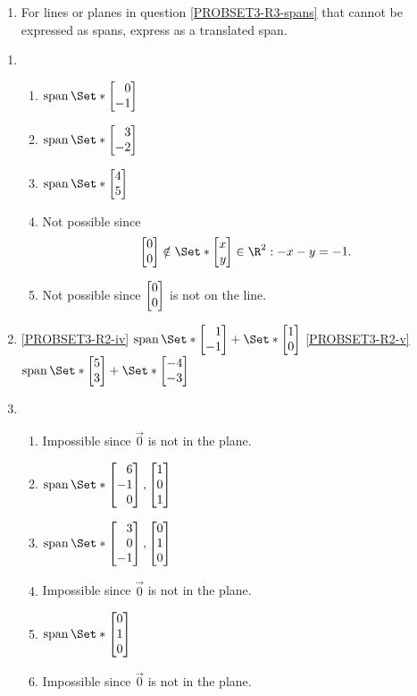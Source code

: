 \begin{exercises}
\begin{problist}
\begin{enumerate}
			\item For lines or planes in question \ref{PROBSET3-R3-spans} that cannot
			be expressed as spans, express as a translated
			span.
		\end{enumerate}
		\begin{solution}
			\begin{enumerate}
				\item
				\begin{enumerate}
					\item $\Span\Set*{\mat{0\\-1}}$
					\item $\Span\Set*{\mat{3\\-2}}$
					\item $\Span\Set*{\mat{4\\5}}$
					\item Not possible since \[\mat{0\\0}\notin \Set*{\mat{x\\y}\in \R^2: -x-y=-1}.\]
					\item Not possible since $\mat{0\\0}$ is not on the line.
				\end{enumerate}
				\item
				\ref{PROBSET3-R2-iv} $\Span\Set*{\mat{1\\-1}} + \Set*{\mat{1\\0}}$
				\ref{PROBSET3-R2-v} $\Span\Set*{\mat{5\\3}} + \Set*{\mat{-4\\-3}}$
				\item 
				\begin{enumerate}
					\item Impossible since $\vec 0$ is not in the plane.
					\item $\Span\Set*{\mat{6\\-1\\0}, \mat{1\\0\\1}}$
					\item $\Span\Set*{\mat{3\\0\\-1}, \mat{0\\1\\0}}$
					\item Impossible since $\vec 0$ is not in the plane.
					\item $\Span\Set*{\mat{0\\1\\0}}$
					\item Impossible since $\vec 0$ is not in the plane.

\end{enumerate}
\end{enumerate}
\end{solution}
\end{problist}
\end{exercises}
